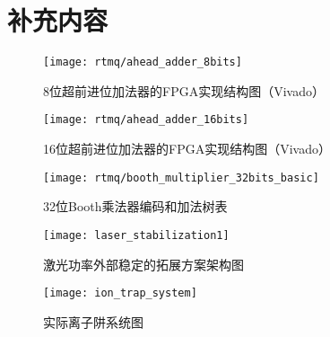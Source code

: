 
\chapter{补充内容}


\begin{figure}
    \centering
    \caption[8位超前进位加法器的FPGA实现结构图]{8位超前进位加法器的FPGA实现结构图（Vivado）\label{fig:ahead_adder_8bits}}
    \texttt{[image: rtmq/ahead\_adder\_8bits]}
\end{figure}

\begin{figure}
    \centering
    \caption[16位超前进位加法器的FPGA实现结构图]{16位超前进位加法器的FPGA实现结构图（Vivado）\label{fig:ahead_adder_16bits}}
    \texttt{[image: rtmq/ahead\_adder\_16bits]}
\end{figure}


\begin{figure}
    \centering
    \caption[32位Booth乘法器编码和加法树表]{32位Booth乘法器编码和加法树表\label{fig:booth_multiplier_32bits_basic}}
    \texttt{[image: rtmq/booth\_multiplier\_32bits\_basic]}
\end{figure}




\begin{figure}
    \centering
    \caption[激光功率外部稳定的拓展方案架构图]{激光功率外部稳定的拓展方案架构图\label{fig:laser_stabilization}}
    \texttt{[image: laser\_stabilization1]}
\end{figure}

\begin{figure}
    \centering
    \caption[实际离子阱系统图]{实际离子阱系统图\label{fig:ion_trap_system}}
    \texttt{[image: ion\_trap\_system]}
\end{figure}